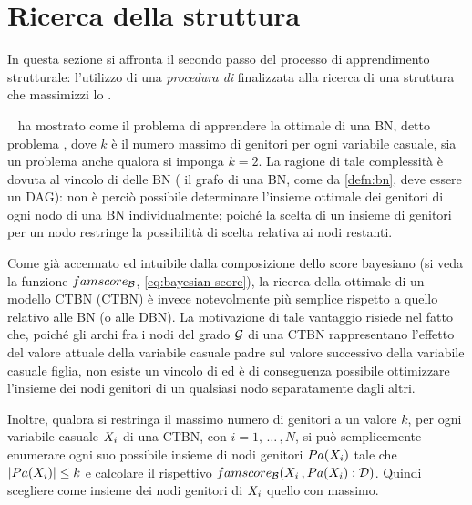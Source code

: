\section{Ricerca della struttura}\label{sec:structurallearning-search}
In questa sezione si affronta il secondo passo del processo di apprendimento strutturale: l'utilizzo di una \emph{procedura di } finalizzata alla ricerca di una struttura che massimizzi lo \emph{}.

~\citet{Chickering1994} ha mostrato come il problema di apprendere la  ottimale di una \acl{BN}, detto problema \emph{}, dove $k$ è il numero massimo di genitori per ogni variabile casuale, sia un problema \emph{} anche qualora si imponga $k=2$. La ragione di tale complessità è dovuta al vincolo di  delle \acs{BN} (\ie{} il grafo di una \acs{BN}, come da \autoref{defn:bn}, deve essere un \acs{DAG}): non è perciò possibile determinare l'insieme ottimale dei genitori di ogni nodo di una \acs{BN} individualmente; poiché la scelta di un insieme di genitori per un nodo restringe la possibilità di scelta relativa ai nodi restanti.

Come già accennato ed intuibile dalla composizione dello score bayesiano (si veda la funzione $famscore_{\mathcal{B}}$, \autoref{eq:bayesian-score}), la ricerca della  ottimale di un modello \acl{CTBN} (\acs{CTBN}) è invece notevolmente più semplice rispetto a quello relativo alle \acs{BN} (o alle \acs{DBN}). La motivazione di tale vantaggio risiede nel fatto che, poiché gli archi fra i nodi del grado $\mathcal{G}$ di una \acs{CTBN} rappresentano l'effetto del valore attuale della variabile casuale padre sul valore successivo della variabile casuale figlia, non esiste un vincolo di  ed è di conseguenza possibile ottimizzare l'insieme dei nodi genitori di un qualsiasi nodo separatamente dagli altri.

Inoltre, qualora si restringa il massimo numero di genitori a un valore $k$, per ogni variabile casuale $\mathnormal{X}_i$ di una \acs{CTBN}, con $i=1,\,\dotsc\,,N$, si può semplicemente enumerare ogni suo possibile insieme di nodi genitori $Pa(\mathnormal{X}_i)$ tale che $\arrowvert Pa(\mathnormal{X}_i) \arrowvert \leq k$ e calcolare il rispettivo  $famscore_{\mathcal{B}}(\mathnormal{X}_i\,,Pa(\mathnormal{X}_i):\mathcal{D})$. Quindi scegliere come insieme dei nodi genitori di $\mathnormal{X}_i$ quello con  massimo.

